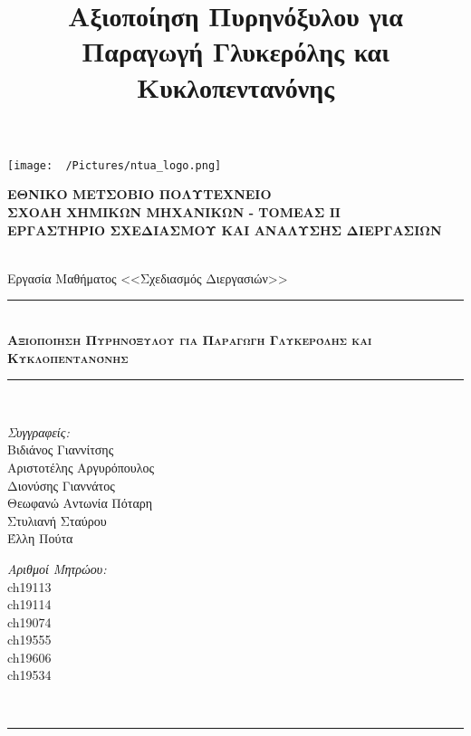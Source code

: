 \documentclass[11pt]{article}
\date{}
\title{Αξιοποίηση Πυρηνόξυλου για Παραγωγή Γλυκερόλης και Κυκλοπεντανόνης}
\newcommand{\HRule}{\rule{\linewidth}{0.5mm}}
\begin{document}
\renewcommand{\abstractname}{Περίληψη}
\renewcommand{\tablename}{Πίνακας}
\renewcommand{\figurename}{Σχήμα}
\renewcommand\listingscaption{Κώδικας}

\renewcommand{\contentsname}{Περιεχόμενα}
\begin{titlepage}

\begin{center}
  \begin{minipage}{0.15\textwidth}
    \begin{flushleft}
      \texttt{[image: ~/Pictures/ntua\_logo.png]}\\[0.4cm]    
    \end{flushleft}
  \end{minipage}
  \begin{minipage}{0.80\textwidth}
    \textsc{\bfseries \large ΕΘΝΙΚΟ ΜΕΤΣΟΒΙΟ ΠΟΛΥΤΕΧΝΕΙΟ}\\[0.2cm]
    \textsc{\bfseries \large ΣΧΟΛΗ ΧΗΜΙΚΩΝ ΜΗΧΑΝΙΚΩΝ - ΤΟΜΕΑΣ ΙΙ}\\[0.2cm]
    \textsc{\bfseries \normalsize ΕΡΓΑΣΤΗΡΙΟ ΣΧΕΔΙΑΣΜΟΥ ΚΑΙ ΑΝΑΛΥΣΗΣ ΔΙΕΡΓΑΣΙΩΝ}\\[0.2cm]
  \end{minipage}
  \\[1.5cm]

  \Large Εργασία Μαθήματος <<Σχεδιασμός Διεργασιών>>\\[1.5cm]
  \HRule \\[0.4cm]
  { \textsc{\huge \bfseries Αξιοποίηση Πυρηνόξυλου για Παραγωγή Γλυκερόλης και Κυκλοπεντανόνης}}\\[0.4cm]
  \HRule \\[3cm]

  \begin{minipage}{0.4\textwidth}
    \begin{flushleft} \large
      \emph{Συγγραφείς:}\\
      Βιδιάνος Γιαννίτσης\\
      Αριστοτέλης Αργυρόπουλος\\
      Διονύσης Γιαννάτος\\
      Θεωφανώ Αντωνία Πόταρη\\
      Στυλιανή Σταύρου\\
      Έλλη Πούτα
    \end{flushleft}
  \end{minipage}
  \begin{minipage}{0.4\textwidth}
    \begin{flushright} \large
      \emph{Αριθμοί Μητρώου:}\\
      ch19113\\
      ch19114\\
      ch19074\\
      ch19555\\
      ch19606\\
      ch19534
    \end{flushright}
  \end{minipage}\\[1cm]
  \HRule \\[2cm]


\end{center}
\end{titlepage}
\end{document}
